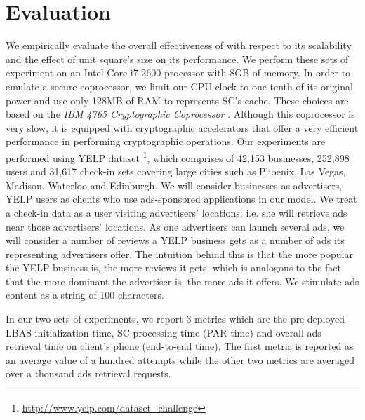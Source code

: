 \section{Evaluation}
\label{sec:evaluation}






We empirically evaluate the overall effectiveness of \codename with respect to its scalability and the effect of unit square's size on its performance. We perform these sets of experiment on an Intel Core i7-2600 processor with 8GB of memory. In order to emulate a secure coprocessor, we limit our CPU clock to one tenth of its original power and use only 128MB of RAM to represents SC's cache. These choices are based on the \textit{IBM 4765  Cryptographic Coprocessor} \cite{IBM_SC}. Although this coprocessor is very slow, it is equipped with cryptographic accelerators that offer a very efficient performance in performing cryptographic operations. Our experiments are performed using YELP dataset \footnote{\url{http://www.yelp.com/dataset_challenge}}, which comprises of 42,153 businesses, 252,898 users and 31,617 check-in sets covering large cities such as Phoenix, Las Vegas, Madison, Waterloo and Edinburgh. We will consider businesses as advertisers, YELP users as clients who use ads-sponsored applications in our model. We treat a check-in data as a user visiting advertisers' locations; i.e. she will retrieve ads near those advertisers' locations. As one advertisers can launch several ads, we will consider a number of reviews a YELP business gets as a number of ads its representing advertisers offer. The intuition behind this is that the more popular the YELP business is, the more reviews it gets, which is analogous to the fact that the more dominant the advertiser is, the more ads it offers. We stimulate ads content as a string of 100 characters.

In our two sets of experiments, we report 3 metrics which are the pre-deployed LBAS initialization time, SC processing time (PAR time) and overall ads retrieval time on client's phone (end-to-end time). The first metric is reported as an average value of a hundred attempts while the other two metrics are averaged over a thousand ads retrieval requests.

